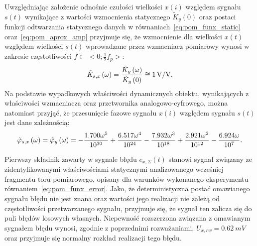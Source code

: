 Uwzględniając założenie odnośnie czułości wielkości $x(i)$ względem sygnału $s(t)$ wynikające z wartości wzmocnienia statycznego $\tilde{K}_{y}(0)$ oraz postaci funkcji odtwarzania statycznego danych w równaniach~\eqref{eq:pom_funx_static} oraz~\eqref{eq:pom_aprox_amp} przyjmuje się, że wzmocnienie dla wielkości $x(t)$ względem wielkości $s(t)$ wprowadzane przez wzmacniacz pomiarowy wynosi w zakresie częstotliwości $f \in~<0; \frac{1}{2} f_{p}>$:
\begin{equation}
\tilde{K}_{s,x} \left(\omega\right) = \frac{\tilde{K}_{y} \left(\omega\right)}{\tilde{K}_{y} \left(0\right)} \cong \qty{1}{V \per V} \label{eq:pom_dwtin_amp}.
\end{equation}
Na podstawie wypadkowych właściwości dynamicznych obiektu, wynikających z właściwości wzmacniacza oraz przetwornika analogowo-cyfrowego, można natomiast przyjąć, że przesunięcie fazowe sygnału $x(i)$ względem sygnału $s(t)$ jest dane zależnością:
\begin{equation}
\tilde{\varphi}_{s,x} \left(\omega\right) = \tilde{\varphi}_{y} \left(\omega\right) = -\frac{1.700 \omega^{5}}{\num{e30}} + \frac{6.517 \omega^{4}}{\num{e24}} - \frac{7.932 \omega^{3}}{\num{e18}} + \frac{2.921 \omega^{2}}{\num{e12}} - \frac{6.924 \omega}{\num{e07}} \label{eq:pom_dwtin_phi}.
\end{equation}

Pierwszy składnik zawarty w sygnale błędu $e_{x,\Sigma}(t)$ stanowi sygnał związany ze zidentyfikowanymi właściwościami statycznymi analizowanego wcześniej fragmentu toru pomiarowego, opisany dla warunków wykonanego eksperymentu równaniem~\eqref{eq:pom_funx_error}. Jako, że deterministyczna postać omawianego sygnału błędu nie jest znana oraz wartości jego realizacji nie zależą od częstotliwości przetwarzanego sygnału, przyjmuje się, że sygnał ten zalicza się do puli błędów losowych własnych. Niepewność rozszerzona związana z omawianym sygnałem błędu wynosi, zgodnie z poprzednimi rozważaniami, $U_{x,rw} = \qty{0.62}{mV}$ oraz przyjmuje się normalny rozkład realizacji tego błędu.

